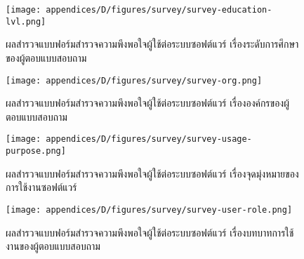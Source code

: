 
\begin{figure}[H]
    \centering
    \texttt{[image: appendices/D/figures/survey/survey-education-lvl.png]}
    \caption[ผลสำรวจแบบฟอร์มสำรวจความพึงพอใจผู้ใช้ต่อระบบซอฟต์แวร์ (ระดับการศึกษา)]{ผลสำรวจแบบฟอร์มสำรวจความพึงพอใจผู้ใช้ต่อระบบซอฟต์แวร์ เรื่องระดับการศึกษาของผู้ตอบแบบสอบถาม}
\end{figure}

\begin{figure}[H]
    \centering
    \texttt{[image: appendices/D/figures/survey/survey-org.png]}
    \caption[ผลสำรวจแบบฟอร์มสำรวจความพึงพอใจผู้ใช้ต่อระบบซอฟต์แวร์ (องค์กร)]{ผลสำรวจแบบฟอร์มสำรวจความพึงพอใจผู้ใช้ต่อระบบซอฟต์แวร์ เรื่ององค์กรของผู้ตอบแบบสอบถาม}
\end{figure}

\begin{figure}[H]
    \centering
    \texttt{[image: appendices/D/figures/survey/survey-usage-purpose.png]}
    \caption[ผลสำรวจแบบฟอร์มสำรวจความพึงพอใจผู้ใช้ต่อระบบซอฟต์แวร์ (จุดมุ่งหมายของการใช้งานซอฟต์แวร์)]{ผลสำรวจแบบฟอร์มสำรวจความพึงพอใจผู้ใช้ต่อระบบซอฟต์แวร์ เรื่องจุดมุ่งหมายของการใช้งานซอฟต์แวร์}
\end{figure}

\begin{figure}[H]
    \centering
    \texttt{[image: appendices/D/figures/survey/survey-user-role.png]}
    \caption[ผลสำรวจแบบฟอร์มสำรวจความพึงพอใจผู้ใช้ต่อระบบซอฟต์แวร์ (บทบาทการใช้งาน)]{ผลสำรวจแบบฟอร์มสำรวจความพึงพอใจผู้ใช้ต่อระบบซอฟต์แวร์ เรื่องบทบาทการใช้งานของผู้ตอบแบบสอบถาม}
\end{figure}

\pagebreak
